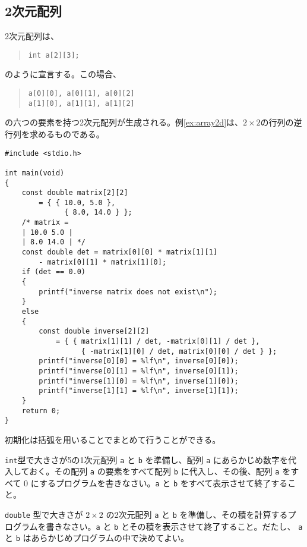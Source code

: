 \subsection{2次元配列}
2次元配列は、
\begin{quote}
    \begin{verbatim}
int a[2][3];
\end{verbatim}
\end{quote}
のように宣言する。この場合、
\begin{quote}
    \begin{verbatim}
a[0][0], a[0][1], a[0][2]
a[1][0], a[1][1], a[1][2]
\end{verbatim}
\end{quote}
の六つの要素を持つ2次元配列が生成される。例\ref{ex:array2d}は、\(2 \times 2\)の行列の逆行列を求めるものである。
\begin{reidai}\label{ex:array2d}
    \begin{verbatim}
#include <stdio.h>

int main(void)
{
    const double matrix[2][2]
        = { { 10.0, 5.0 },
              { 8.0, 14.0 } };
    /* matrix =
    | 10.0 5.0 |
    | 8.0 14.0 | */
    const double det = matrix[0][0] * matrix[1][1]
        - matrix[0][1] * matrix[1][0];
    if (det == 0.0)
    {
        printf("inverse matrix does not exist\n");
    }
    else
    {
        const double inverse[2][2]
            = { { matrix[1][1] / det, -matrix[0][1] / det },
                  { -matrix[1][0] / det, matrix[0][0] / det } };
        printf("inverse[0][0] = %lf\n", inverse[0][0]);
        printf("inverse[0][1] = %lf\n", inverse[0][1]);
        printf("inverse[1][0] = %lf\n", inverse[1][0]);
        printf("inverse[1][1] = %lf\n", inverse[1][1]);
    }
    return 0;
}
\end{verbatim}
\end{reidai}

初期化は括弧を用いることでまとめて行うことができる。

\begin{renshuu}\label{prob:3-1}
    \texttt{int}型で大きさが5の1次元配列 \texttt{a} と \texttt{b} を準備し、配列 \texttt{a} にあらかじめ数字を代入しておく。その配列 \texttt{a} の要素をすべて配列 \texttt{b} に代入し、その後、配列 \texttt{a} をすべて 0 にするプログラムを書きなさい。\texttt{a} と \texttt{b} をすべて表示させて終了すること。
\end{renshuu}

\begin{renshuu}\label{prob:3-2}
    \texttt{double} 型で大きさが \(2\times2\) の2次元配列 \texttt{a} と \texttt{b} を準備し、その積を計算するプログラムを書きなさい。\texttt{a} と \texttt{b} とその積を表示させて終了すること。だたし、 \texttt{a} と \texttt{b} はあらかじめプログラムの中で決めてよい。
\end{renshuu}

